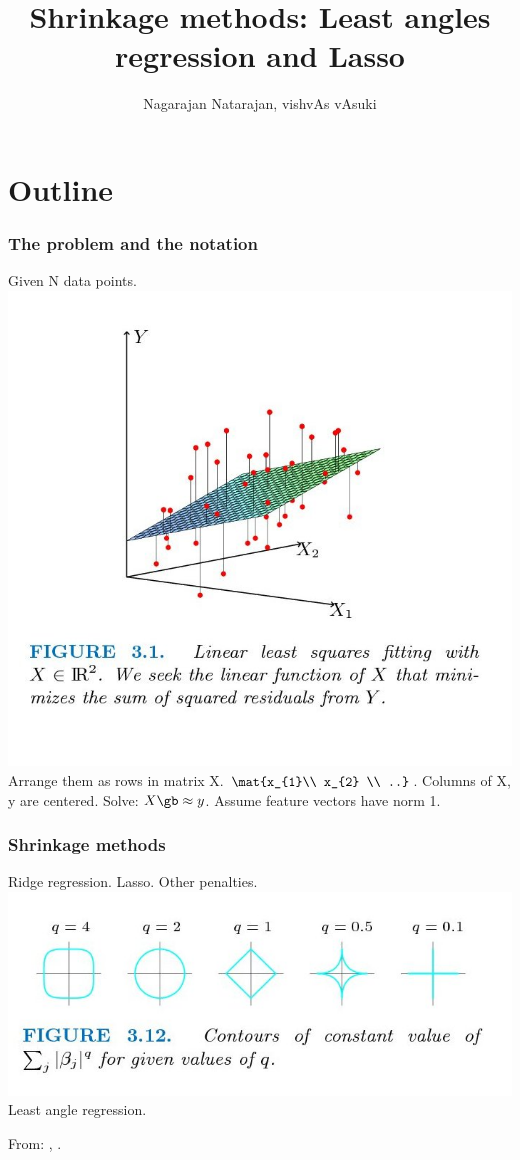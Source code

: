 \documentclass{beamer}
\title{Shrinkage methods: Least angles regression and Lasso}
\author{Nagarajan Natarajan, vishvAs vAsuki}
\begin{document}
\frame{\titlepage}

\section{Outline}
\begin{frame}
\frametitle{The problem and the notation}
\begin{itemize}
\pitem Given N data points. \includegraphics[scale=0.1]{images/figures3-0.jpg}
\pitem Arrange them as rows in matrix X. $\mat{x_{1}\\ x_{2} \\ ..}$.
\pitem Columns of X, y are centered.
\pitem Solve: $X\gb \approx y$.
\pitem Assume feature vectors have norm 1. 
\end{itemize}
\end{frame}

\begin{frame}
\frametitle{Shrinkage methods}
\begin{itemize}
\pitem Ridge regression.
\pitem Lasso.
\pitem Other penalties.\\
\includegraphics[scale=.25]{images/figures3-11.jpg}
\pitem Least angle regression.
\end{itemize}
From: \cite{hastie-elements}, \cite{hastie-lars}.

\end{frame}
\end{document}
